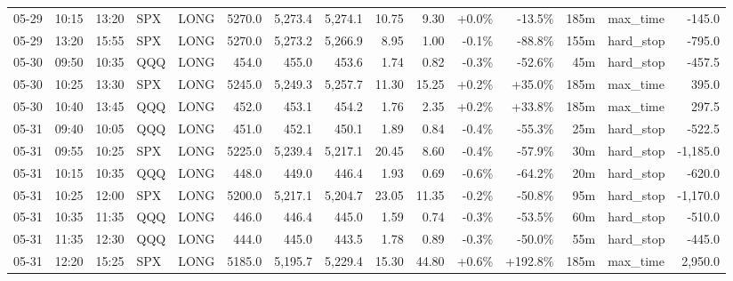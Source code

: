 \documentclass[11pt,a4paper,twoside]{article}
\begin{document}
\begin{landscape}
\begin{center}
\begin{longtable}{>{\color{txtmain}}l l l l l r r r r r r r r >{\color{txtmain}}l r}
05-29 & 10:15 & 13:20 & SPX & LONG & 5270.0 & 5,273.4 & 5,274.1 & 10.75 & 9.30 & \textcolor{wingreen}{+0.0\%} & \textcolor{lossred}{-13.5\%} & 185m & max\_time & \textcolor{lossred}{-145.0} \\
05-29 & 13:20 & 15:55 & SPX & LONG & 5270.0 & 5,273.2 & 5,266.9 & 8.95 & 1.00 & \textcolor{lossred}{-0.1\%} & \textcolor{lossred}{-88.8\%} & 155m & hard\_stop & \textcolor{lossred}{-795.0} \\
05-30 & 09:50 & 10:35 & QQQ & LONG & 454.0 & 455.0 & 453.6 & 1.74 & 0.82 & \textcolor{lossred}{-0.3\%} & \textcolor{lossred}{-52.6\%} & 45m & hard\_stop & \textcolor{lossred}{-457.5} \\
05-30 & 10:25 & 13:30 & SPX & LONG & 5245.0 & 5,249.3 & 5,257.7 & 11.30 & 15.25 & \textcolor{wingreen}{+0.2\%} & \textcolor{wingreen}{+35.0\%} & 185m & max\_time & \textcolor{wingreen}{395.0} \\
05-30 & 10:40 & 13:45 & QQQ & LONG & 452.0 & 453.1 & 454.2 & 1.76 & 2.35 & \textcolor{wingreen}{+0.2\%} & \textcolor{wingreen}{+33.8\%} & 185m & max\_time & \textcolor{wingreen}{297.5} \\
05-31 & 09:40 & 10:05 & QQQ & LONG & 451.0 & 452.1 & 450.1 & 1.89 & 0.84 & \textcolor{lossred}{-0.4\%} & \textcolor{lossred}{-55.3\%} & 25m & hard\_stop & \textcolor{lossred}{-522.5} \\
05-31 & 09:55 & 10:25 & SPX & LONG & 5225.0 & 5,239.4 & 5,217.1 & 20.45 & 8.60 & \textcolor{lossred}{-0.4\%} & \textcolor{lossred}{-57.9\%} & 30m & hard\_stop & \textcolor{lossred}{-1,185.0} \\
05-31 & 10:15 & 10:35 & QQQ & LONG & 448.0 & 449.0 & 446.4 & 1.93 & 0.69 & \textcolor{lossred}{-0.6\%} & \textcolor{lossred}{-64.2\%} & 20m & hard\_stop & \textcolor{lossred}{-620.0} \\
05-31 & 10:25 & 12:00 & SPX & LONG & 5200.0 & 5,217.1 & 5,204.7 & 23.05 & 11.35 & \textcolor{lossred}{-0.2\%} & \textcolor{lossred}{-50.8\%} & 95m & hard\_stop & \textcolor{lossred}{-1,170.0} \\
05-31 & 10:35 & 11:35 & QQQ & LONG & 446.0 & 446.4 & 445.0 & 1.59 & 0.74 & \textcolor{lossred}{-0.3\%} & \textcolor{lossred}{-53.5\%} & 60m & hard\_stop & \textcolor{lossred}{-510.0} \\
05-31 & 11:35 & 12:30 & QQQ & LONG & 444.0 & 445.0 & 443.5 & 1.78 & 0.89 & \textcolor{lossred}{-0.3\%} & \textcolor{lossred}{-50.0\%} & 55m & hard\_stop & \textcolor{lossred}{-445.0} \\
05-31 & 12:20 & 15:25 & SPX & LONG & 5185.0 & 5,195.7 & 5,229.4 & 15.30 & 44.80 & \textcolor{wingreen}{+0.6\%} & \textcolor{wingreen}{+192.8\%} & 185m & max\_time & \textcolor{wingreen}{2,950.0} \\

\end{longtable}
\end{center}
\end{landscape}
\end{document}
